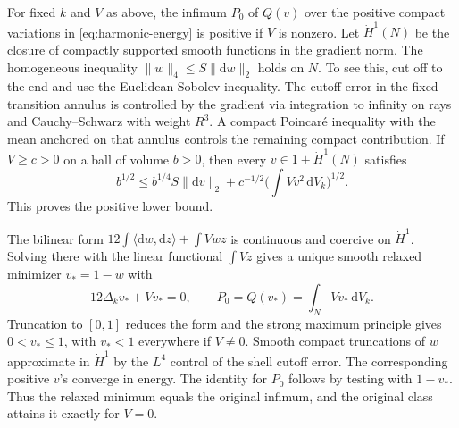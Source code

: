 \documentclass[11pt]{article}
\numberwithin{equation}{section}
\newcommand{\dd}{\mathrm{d}}
\newcommand{\ip}[2]{\langle #1,#2\rangle}
\newcommand{\norm}[1]{\lVert #1\rVert}
\begin{document}
For fixed \(k\) and \(V\) as above, the infimum \(P_0\) of \(Q(v)\)
over the positive compact variations in \eqref{eq:harmonic-energy}
is positive if \(V\) is nonzero. Let \(\dot H^1(N)\) be the closure
of compactly supported smooth functions in the gradient norm. The
homogeneous inequality \(\norm{w}_4\le S\norm{\dd w}_2\) holds on
\(N\). To see this, cut off to the end and use the Euclidean Sobolev
inequality. The cutoff error in the fixed transition annulus is
controlled by the gradient via integration to infinity on rays
and Cauchy--Schwarz with weight \(R^3\). A compact Poincar\'e
inequality with the mean anchored on that annulus controls the
remaining compact contribution. If \(V\ge c>0\) on a ball of
volume \(b>0\), then every \(v\in1+\dot H^1(N)\) satisfies
\[
 b^{1/2}\le b^{1/4}S\norm{\dd v}_2+
    c^{-1/2}\Big(\int Vv^2\,\dd V_k\Big)^{1/2}.
\]
This proves the positive lower bound.

The bilinear form \(12\int\ip{\dd w}{\dd z}+\int Vwz\) is continuous
and coercive on \(\dot H^1\). Solving there with the linear functional
\(\int Vz\) gives a unique smooth relaxed minimizer \(v_*=1-w\)
with
\begin{equation}\label{eq:cap-eqn}
 12\Delta_k v_*+Vv_*=0,\qquad
 P_0=Q(v_*)=\int_N Vv_*\,\dd V_k .
\end{equation}
Truncation to \([0,1]\) reduces the form and the strong maximum
principle gives \(0<v_*\le1\), with \(v_*<1\) everywhere if \(V\ne0\).
Smooth compact truncations of \(w\) approximate in \(\dot H^1\)
by the \(L^4\) control of the shell cutoff error. The corresponding
positive \(v\)'s converge in energy. The identity for \(P_0\) follows
by testing with \(1-v_*\). Thus the relaxed minimum equals the
original infimum, and the original class attains it exactly for \(V=0\).
\end{document}
